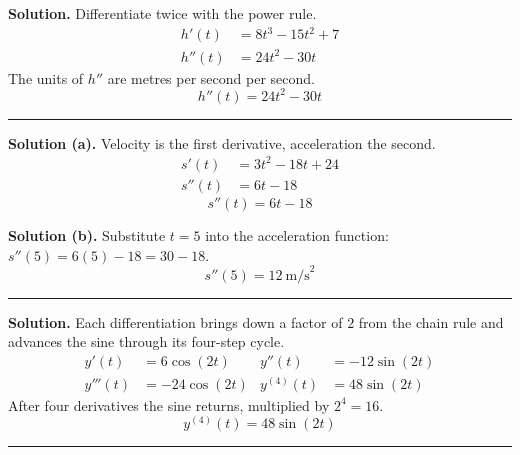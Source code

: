 \documentclass[12pt]{article}
\begin{document}



\textbf{Solution.} Differentiate twice with the power rule.
\begin{align*}
  h'(t)  &= 8t^3 - 15t^2 + 7 \\
  h''(t) &= 24t^2 - 30t
\end{align*}
The units of $h''$ are metres per second per second.
\[ \boxed{h''(t) = 24t^2 - 30t} \]

\vspace{0.2cm}\noindent\rule{\linewidth}{0.2pt}


\textbf{Solution (a).} Velocity is the first derivative, acceleration the second.
\begin{align*}
  s'(t)  &= 3t^2 - 18t + 24 \\
  s''(t) &= 6t - 18
\end{align*}
\[ \boxed{s''(t) = 6t - 18} \]

\textbf{Solution (b).} Substitute $t = 5$ into the acceleration function:
$s''(5) = 6(5) - 18 = 30 - 18$.
\[ \boxed{s''(5) = 12\ \text{m/s}^2} \]

\vspace{0.2cm}\noindent\rule{\linewidth}{0.2pt}


\textbf{Solution.} Each differentiation brings down a factor of $2$ from the
chain rule and advances the sine through its four-step cycle.
\begin{align*}
  y'(t)   &= 6\cos(2t)   & y''(t)  &= -12\sin(2t) \\
  y'''(t) &= -24\cos(2t) & y^{(4)}(t) &= 48\sin(2t)
\end{align*}
After four derivatives the sine returns, multiplied by $2^4 = 16$.
\[ \boxed{y^{(4)}(t) = 48\sin(2t)} \]

\vspace{0.2cm}\noindent\rule{\linewidth}{0.2pt}

\end{document}

